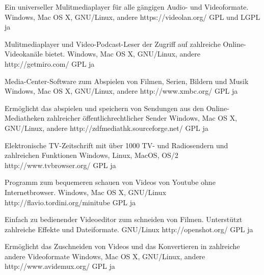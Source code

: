 \documentclass[11pt,a4paper,landscape,twocolumn]{article}
\begin{document}


{Ein universeller Mulitmediaplayer für alle gängigen Audio- und Videoformate.}
{Windows, Mac OS X, GNU/Linux, andere}
{https://videolan.org/}
{GPL und LGPL}
{ja}

{Mulitmediaplayer und Video-Podcast-Leser der Zugriff auf zahlreiche Online-Videokanäle bietet.}
{Windows, Mac OS X, GNU/Linux, andere}
{http://getmiro.com/}
{GPL}
{ja}

{Media-Center-Software zum Abspielen von Filmen, Serien, Bildern und Musik}
{Windows, Mac OS X, GNU/Linux, andere}
{http://www.xmbc.org/}
{GPL}
{ja}

{Ermöglicht das abspielen und speichern von Sendungen aus den Online-Mediatheken zahlreicher öffentlichrechtlicher Sender}
{Windows, Mac OS X, GNU/Linux, andere}
{http://zdfmediathk.sourceforge.net/}
{GPL}
{ja}


\newpage %


{Elektronische TV-Zeitschrift mit über 1000 TV- und Radiosendern und zahlreichen Funktionen}
{Windows, Linux, MacOS, OS/2}
{http://www.tvbrowser.org/}
{GPL}
{ja}

{Programm zum bequemeren schauen von Videos von Youtube ohne Internetbrowser.}
{Windows, Mac OS X, GNU/Linux}
{http://flavio.tordini.org/minitube}
{GPL}
{ja}

{Einfach zu bedienender Videoeditor zum schneiden von Filmen. Unterstützt zahlreiche Effekte und Dateiformate.}
{GNU/Linux}
{http://openshot.org/}
{GPL}
{ja}

{Ermöglicht das Zuschneiden von Videos und das Konvertieren in zahlreiche andere Videoformate}
{Windows, Mac OS X, GNU/Linux, andere}
{http://www.avidemux.org/}
{GPL}
{ja}
\end{document}
